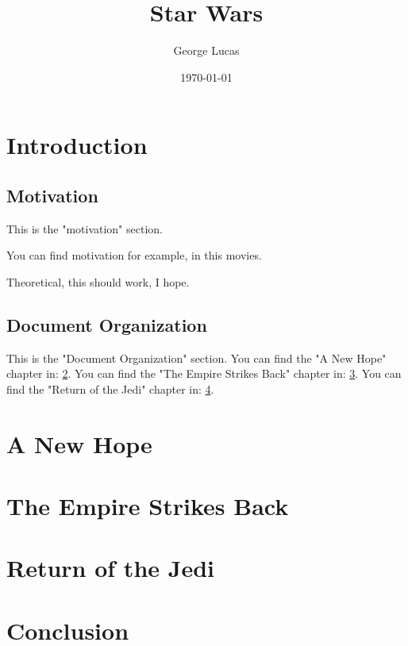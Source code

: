 \documentclass[a4paper, 12pt]{report}
\title{Star Wars}
\author{George Lucas}
\date{\today}
\newcommand*{\eg}[1]{for example, #1}
\newcommand*{\teorica}[1]{Theoretical, #1}
\newenvironment{centro}[1]{\teorica{#1}, I hope.}{}
\begin{document}
  \maketitle

  \tableofcontents
  \chapter{Introduction}
  \label{chap:intro}

    \section{Motivation}
    \label{chap:sec:motivation}
      This is the "motivation" section.

      \begin{center}
        You can find motivation \eg{in this movies}.
      \end{center}
      
      \begin{centro} {this should work}
      \end{centro}
        
      
    \section{Document Organization}
    \label{chap:sec:documentOrganiztion}
      This is the "Document Organization" section. 
      \newline
      You can find the "A New Hope" chapter in: \ref*{chap:newHope}.
      You can find the "The Empire Strikes Back" chapter in: \ref*{chap:empireStrikesBack}.
      You can find the "Return of the Jedi" chapter in: \ref*{chap:returnOfTheJedi}.
  
  \chapter{A New Hope}
  \label{chap:newHope}
  
  \chapter{The Empire Strikes Back}
  \label{chap:empireStrikesBack}

  \chapter{Return of the Jedi}
  \label{chap:returnOfTheJedi}

  \chapter{Conclusion}
  \label{chap:conclusion}

  
\end{document}
